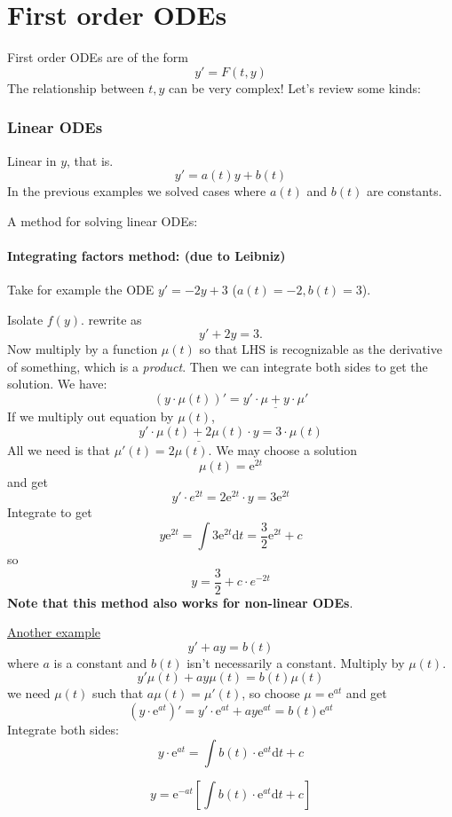 \documentclass{article}
\newcommand{\mathd}{\mathrm{d}}
\newcommand{\mathe}{\mathrm{e}}
\newcommand{\nospace}{}
\newcommand{\tmem}[1]{{\em #1\/}}
\newcommand{\tmstrong}[1]{\textbf{#1}}
\begin{document}
\part{First order ODEs}

First order ODEs are of the form
\[ y' = F (t, y) \]
The relationship between $t, y$ can be very complex! Let's review some kinds:

\section{Linear ODEs}

Linear in $y$, that is.
\[ y' = a (t) y + b (t) \]
In the previous examples we solved cases where $a (t)$ and $b (t)$ are
constants.

A method for solving linear ODEs:

\subsection{Integrating factors method: (due to Leibniz)}

Take for example the ODE $y' = - 2 y + 3$ ($a (t) = - 2, \nospace b (t) = 3$).

Isolate $f (y)$. rewrite as
\[ y' + 2 y = 3. \]
Now multiply by a function $\mu (t)$ so that LHS is recognizable as the
derivative of something, which is a {\tmem{product}}. Then we can integrate
both sides to get the solution. We have:
\[ (y \cdot \mu (t))' = \underline{y' \cdot \mu + y \cdot \mu'} \]
If we multiply out equation by $\mu (t)$,
\[ \underline{y' \cdot \mu (t) + 2 \mu (t) \cdot y} = 3 \cdot \mu (t) \]
All we need is that $\mu' (t) = 2 \mu (t)$. We may choose a solution
\[ \mu (t) = \mathe^{2 t} \]
and get
\[ y' \cdot e^{2 t} = 2 \mathe^{2 t} \cdot y = 3 \mathe^{2 t} \]
Integrate to get
\[ y \mathe^{2 t} = \int 3 \mathe^{2 t} \mathd t = \frac{3}{2} \mathe^{2 t} +
   c \]
so
\[ y = \frac{3}{2} + c \cdot e^{- 2 t} \]
{\tmstrong{Note that this method also works for non-linear ODEs}}.

{\underline{Another example}}
\[ y' + ay = b (t) \]
where $a$ is a constant and $b (t)$ isn't necessarily a constant. Multiply by
$\mu (t)$.
\[ y' \mu (t) + ay \mu (t) = b (t) \mu (t) \]
we need $\mu (t)$ such that $a \mu (t) = \mu' (t)$, so choose $\mu =
\mathe^{at}$ and get
\[ (y \cdot \mathe^{at})' = y' \cdot \mathe^{at} + ay \mathe^{at} = b (t)
   \mathe^{at} \]
Integrate both sides:
\[ y \cdot \mathe^{at} = \int b (t) \cdot \mathe^{at} \mathd t + c \]
\begin{tmornamented}
  \[ y = \mathe^{- at} \left[ \int b (t) \cdot \mathe^{at} \mathd t + c
     \right] \]
\end{tmornamented}
\end{document}
